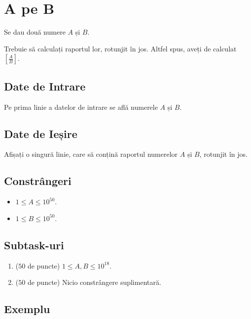 \documentclass[12pt,a4paper]{article}
\begin{document}


\section*{A pe B}


Se dau două numere $A$ și $B$.

Trebuie să calculați raportul lor, rotunjit în jos. Altfel spus, aveți de calculat $[\frac{A}{B}]$.


\subsection*{Date de Intrare}


Pe prima linie a datelor de intrare se află numerele $A$ și $B$.

\subsection*{Date de Ieșire}

Afișați o singură linie, care să conțină raportul numerelor $A$ și $B$, rotunjit în jos.

\subsection*{Constrângeri}

\begin{itemize}
    \item $1 \leq A \leq 10^{50}$.
    \item $1 \leq B \leq 10^{50}$.
\end{itemize}


\subsection*{Subtask-uri}

\begin{enumerate}
    \item ($50$ de puncte) $1 \leq A, B \leq 10^{18}$.
    \item ($50$ de puncte) Nicio constrângere suplimentară.
\end{enumerate}

\subsection*{Exemplu}
\end{document}

